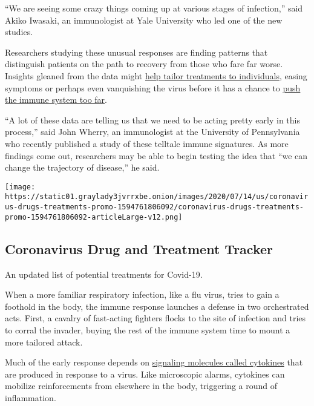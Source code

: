 ``We are seeing some crazy things coming up at various stages of
infection,'' said Akiko Iwasaki, an immunologist at Yale University who
led one of the new studies.

Researchers studying these unusual responses are finding patterns that
distinguish patients on the path to recovery from those who fare far
worse. Insights gleaned from the data might
\href{https://www.nytimes3xbfgragh.onion/interactive/2020/science/coronavirus-drugs-treatments.html}{help
tailor treatments to individuals}, easing symptoms or perhaps even
vanquishing the virus before it has a chance to
\href{https://www.nytimes3xbfgragh.onion/2020/04/01/health/coronavirus-cytokine-storm-immune-system.html}{push
the immune system too far}.

``A lot of these data are telling us that we need to be acting pretty
early in this process,'' said John Wherry, an immunologist at the
University of Pennsylvania who recently published a study of these
telltale immune signatures. As more findings come out, researchers may
be able to begin testing the idea that ``we can change the trajectory of
disease,'' he said.

\href{https://www.nytimes3xbfgragh.onion/interactive/2020/science/coronavirus-drugs-treatments.html}{}

\texttt{[image: https://static01.graylady3jvrrxbe.onion/images/2020/07/14/us/coronavirus-drugs-treatments-promo-1594761806092/coronavirus-drugs-treatments-promo-1594761806092-articleLarge-v12.png]}

\hypertarget{coronavirus-drug-and-treatment-tracker}{%
\subsection{Coronavirus Drug and Treatment
Tracker}\label{coronavirus-drug-and-treatment-tracker}}

An updated list of potential treatments for Covid-19.

When a more familiar respiratory infection, like a flu virus, tries to
gain a foothold in the body, the immune response launches a defense in
two orchestrated acts. First, a cavalry of fast-acting fighters flocks
to the site of infection and tries to corral the invader, buying the
rest of the immune system time to mount a more tailored attack.

Much of the early response depends on
\href{https://www.nytimes3xbfgragh.onion/2020/04/01/health/coronavirus-cytokine-storm-immune-system.html}{signaling
molecules called cytokines} that are produced in response to a virus.
Like microscopic alarms, cytokines can mobilize reinforcements from
elsewhere in the body, triggering a round of inflammation.

